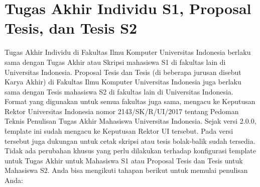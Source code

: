 \section{Tugas Akhir Individu S1, Proposal Tesis, dan Tesis S2}
\label{sec:skripsiIndividu}
Tugas Akhir Individu di Fakultas Ilmu Komputer Universitas Indonesia berlaku sama dengan Tugas Akhir atau Skripsi mahasiswa S1 di fakultas lain di Universitas Indonesia.
Proposal Tesis dan Tesis (di beberapa jurusan disebut Karya Akhir) di Fakultas Ilmu Komputer Universitas Indonesia juga berlaku sama dengan Tesis mahasiswa S2 di fakultas lain di Universitas Indonesia.
Format yang digunakan untuk semua fakultas juga sama, mengacu ke Keputusan Rektor Universitas Indonesia nomor 2143/SK/R/UI/2017 tentang Pedoman Teknis Penulisan Tugas Akhir Mahasiswa Universitas Indonesia.
Sejak versi 2.0.0, \f{template} ini sudah mengacu ke Keputusan Rektor UI tersebut.
Pada versi tersebut juga dukungan untuk cetak skripsi atau tesis bolak-balik sudah tersedia.
Tidak ada perubahan khusus yang perlu dilakukan terhadap konfigurasi \f{template} untuk Tugas Akhir untuk Mahasiswa S1 atau Proposal Tesis dan Tesis untuk Mahasiswa S2.
Anda bisa mengikuti tahapan berikut untuk memulai penulisan Anda:
